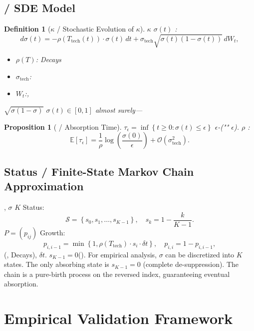 \documentclass[11pt,a4paper]{article}
\newtheorem{proposition}[theorem]{Proposition}
\newtheorem{definition}[theorem]{Definition}
\theoremstyle{definition}
\newcommand{\coupling}{\kappa}
\newcommand{\suppress}{\sigma}
\newcommand{\E}{\mathbb{E}}
\newcommand{\paren}[1]{\left(#1\right)}
\newcommand{\set}[1]{\left\{#1\right\}}
\newcommand{\calO}{\mathcal{O}}
\begin{document}
\subsection{ / SDE Model}
\begin{definition}[$\coupling$ / Stochastic Evolution of $\coupling$]
\label{def:sde}
$\coupling$ $\suppress(t)$ : 
\[
d\suppress(t) = -\rho(T_{\text{tech}}(t)) \cdot \suppress(t) \, dt
 + \sigma_{\text{tech}} \sqrt{\suppress(t)(1-\suppress(t))} \, dW_t,
\]
\begin{itemize}
 \item $\rho(T)$: Decays
 \item $\sigma_{\text{tech}}$: 
 \item $W_t$:, 
\end{itemize}
 $\sqrt{\suppress(1-\suppress)}$ $\suppress(t) \in [0,1]$ almost surely---
\end{definition}
\begin{proposition}[ / Absorption Time]
\label{prop:absorption}
 $\tau_{\epsilon} = \inf\set{t \geq 0 : \suppress(t) \leq \epsilon}$ 
$\epsilon$-("" $\epsilon$).
 $\rho$ : 
\[
\E[\tau_{\epsilon}] = \frac{1}{\rho} \log\paren{\frac{\suppress(0)}{\epsilon}}
 + \calO(\sigma_{\text{tech}}^2).
\]
\end{proposition}
\subsection{Status / Finite-State Markov Chain Approximation}
, $\suppress$ $K$ Status:
\[
\mathcal{S} = \set{s_0, s_1, \dots, s_{K-1}}, \quad
s_k = 1 - \frac{k}{K-1}.
\]
 $P = (p_{ij})$ Growth: 
\[
p_{i, i-1} = \min\set{1, \rho(T_{\text{tech}}) \cdot s_i \cdot \delta t},
\quad
p_{i, i} = 1 - p_{i, i-1},
\]
(, Decays), $\delta t$.
 $s_{K-1} = 0$().
For empirical analysis, $\suppress$ can be discretized into $K$ states.
The only absorbing state is $s_{K-1} = 0$ (complete de-suppression).
The chain is a pure-birth process on the reversed index, guaranteeing eventual absorption.
\section{}
\section{Empirical Validation Framework}
\end{document}
